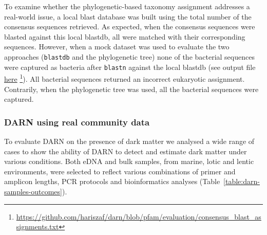    To examine whether the phylogenetic-based taxonomy assignment addresses a real-world issue, a local blast database was built using the total number of the consensus sequences retrieved. 
   As expected, when the consensus sequences were blasted against this local blastdb, all were matched with their corresponding sequences. 
   However, when a mock dataset was used to evaluate the two approaches (\texttt{blastdb} and the phylogenetic tree) none of the bacterial sequences were captured as bacteria after \texttt{blastn} against the local blastdb (see output file \href{https://github.com/hariszaf/darn/blob/pfam/evaluation/consensus_blast_assignments.txt}{here} 
   \footnote{
      \href{https://github.com/hariszaf/darn/blob/pfam/evaluation/consensus_blast_assignments.txt}{https://github.com/hariszaf/darn/blob/pfam/evaluation/consensus\_blast\_assignments.txt}
   }). 
   All bacterial sequences returned an incorrect eukaryotic assignment. 
   Contrarily, when the phylogenetic tree was used, all the bacterial sequences were captured.


   \subsubsection*{DARN using real community data}

   To evaluate DARN on the presence of dark matter we analysed a wide range of cases to show the ability of DARN to detect and estimate dark matter under various conditions. 
   Both eDNA and bulk samples, from marine, lotic and lentic environments, were selected to reflect various combinations of primer and amplicon lengths, PCR protocols and bioinformatics analyses (Table~\ref{table:darn-samples-outcomes}).

